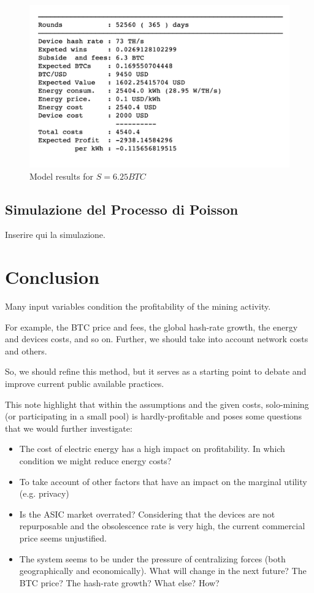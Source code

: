 \documentclass{article}
\begin{document}
\begin{figure}[h]
    \centering
    \includegraphics[scale=0.50]{img/results.png}
    \caption{Model results for $S = 6.25 BTC$}
    \label{fig:results}
\end{figure}

\clearpage

\subsection{Simulazione del Processo di Poisson}

Inserire qui la simulazione.

\section{Conclusion}

Many input variables condition the profitability of the mining activity.

For example, the BTC price and fees, the global hash-rate growth, the energy and devices costs, and so on. Further, we should take into account network costs and others.

So, we should refine this method, but it serves as a starting point to debate and improve current public available practices.

This note highlight that within the assumptions and the given costs, solo-mining (or participating in a small pool) is hardly-profitable and poses some questions that we would further investigate:


\begin{itemize}
    \item The cost of electric energy has a high impact on profitability. In which condition we might reduce energy costs?
    \item To take account of other factors that have an impact on the marginal utility (e.g. privacy)
    \item Is the ASIC market overrated? Considering that the devices are not repurposable and the obsolescence rate is very high, the current commercial price seems unjustified.
    \item The system seems to be under the pressure of centralizing forces (both geographically and economically). What will change in the next future? The BTC price? The hash-rate growth? What else? How?
\end{itemize}
\end{document}
